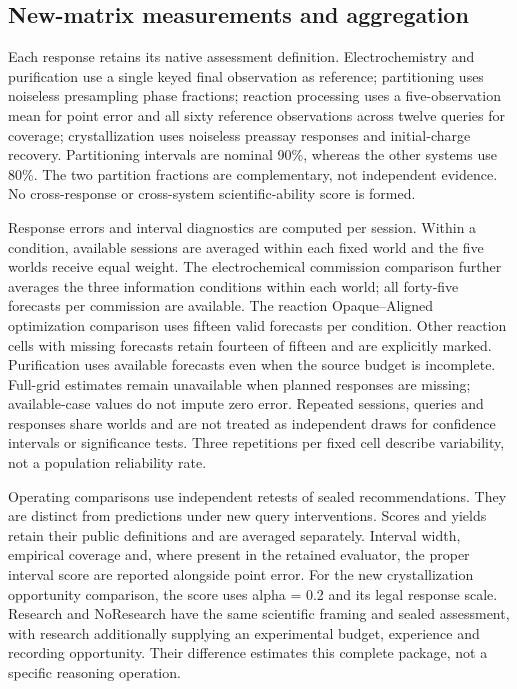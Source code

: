 \documentclass[10pt,a4paper]{article}
\begin{document}
\subsection{New-matrix measurements and aggregation}\label{new-matrix-measurements-and-aggregation}

Each response retains its native assessment definition. Electrochemistry and purification use a single keyed final observation as reference; partitioning uses noiseless presampling phase fractions; reaction processing uses a five-observation mean for point error and all sixty reference observations across twelve queries for coverage; crystallization uses noiseless preassay responses and initial-charge recovery. Partitioning intervals are nominal 90\%, whereas the other systems use 80\%. The two partition fractions are complementary, not independent evidence. No cross-response or cross-system scientific-ability score is formed.

Response errors and interval diagnostics are computed per session. Within a condition, available sessions are averaged within each fixed world and the five worlds receive equal weight. The electrochemical commission comparison further averages the three information conditions within each world; all forty-five forecasts per commission are available. The reaction Opaque--Aligned optimization comparison uses fifteen valid forecasts per condition. Other reaction cells with missing forecasts retain fourteen of fifteen and are explicitly marked. Purification uses available forecasts even when the source budget is incomplete. Full-grid estimates remain unavailable when planned responses are missing; available-case values do not impute zero error. Repeated sessions, queries and responses share worlds and are not treated as independent draws for confidence intervals or significance tests. Three repetitions per fixed cell describe variability, not a population reliability rate.

Operating comparisons use independent retests of sealed recommendations. They are distinct from predictions under new query interventions. Scores and yields retain their public definitions and are averaged separately. Interval width, empirical coverage and, where present in the retained evaluator, the proper interval score are reported alongside point error. For the new crystallization opportunity comparison, the score uses alpha = 0.2 and its legal response scale. Research and NoResearch have the same scientific framing and sealed assessment, with research additionally supplying an experimental budget, experience and recording opportunity. Their difference estimates this complete package, not a specific reasoning operation.
\end{document}
